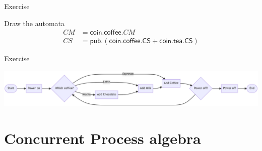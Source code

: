 \documentclass[aspectratio=169]{beamer}
\begin{document}
\begin{slide}{Exercise}
  \begin{exampleblock}{\exercise Draw the automata}
  \begin{align*}
    CM &= \mathsf{coin.coffee}.CM
    \\
    CS &= \mathsf{pub.(coin.coffee.CS + coin.tea.CS)}
  \end{align*}
\end{exampleblock}

\end{slide}


\begin{slide}{Exercise}
  \centering

  \includegraphics[width=1.0\textwidth]{images/coffee-flow.png}


\end{slide}




\section{Concurrent Process algebra}
\end{document}

